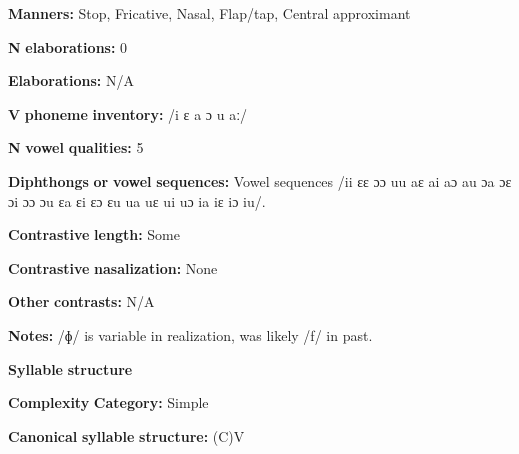 \begin{styleBody}
\textbf{Manners:} Stop, Fricative, Nasal, Flap/tap, Central approximant
\end{styleBody}

\begin{styleBody}
\textbf{N} \textbf{elaborations:} 0
\end{styleBody}

\begin{styleBody}
\textbf{Elaborations:} N/A
\end{styleBody}

\begin{styleBody}
\textbf{V} \textbf{phoneme} \textbf{inventory:} /i ɛ a ɔ u aː/
\end{styleBody}

\begin{styleBody}
\textbf{N} \textbf{vowel} \textbf{qualities:} 5
\end{styleBody}

\begin{styleBody}
\textbf{Diphthongs} \textbf{or} \textbf{vowel} \textbf{sequences:} Vowel sequences /ii ɛɛ ɔɔ uu aɛ ai aɔ au ɔa ɔɛ ɔi ɔɔ ɔu ɛa ɛi ɛɔ ɛu ua uɛ ui uɔ ia iɛ iɔ iu/.
\end{styleBody}

\begin{styleBody}
\textbf{Contrastive} \textbf{length:} Some
\end{styleBody}

\begin{styleBody}
\textbf{Contrastive} \textbf{nasalization:} None
\end{styleBody}

\begin{styleBody}
\textbf{Other} \textbf{contrasts:} N/A
\end{styleBody}

\begin{styleBody}
\textbf{Notes:} /ɸ/ is variable in realization, was likely /f/ in past.
\end{styleBody}

\begin{styleBody}
\textbf{Syllable} \textbf{structure}
\end{styleBody}

\begin{styleBody}
\textbf{Complexity} \textbf{Category:} Simple
\end{styleBody}

\begin{styleBody}
\textbf{Canonical} \textbf{syllable} \textbf{structure:} (C)V \citep[533-8]{Bauer1999}
\end{styleBody}

